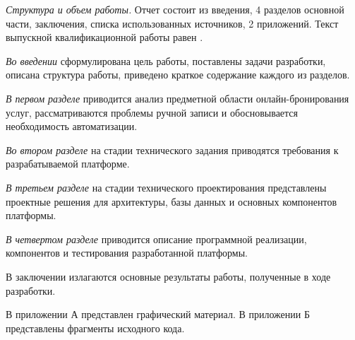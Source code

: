 \emph{Структура и объем работы.} Отчет состоит из введения, 4 разделов основной части, заключения, списка использованных источников, 2 приложений. Текст выпускной квалификационной работы равен .

\emph{Во введении} сформулирована цель работы, поставлены задачи разработки, описана структура работы, приведено краткое содержание каждого из разделов.

\emph{В первом разделе} приводится анализ предметной области онлайн-бронирования услуг, рассматриваются проблемы ручной записи и обосновывается необходимость автоматизации.

\emph{Во втором разделе} на стадии технического задания приводятся требования к разрабатываемой платформе.

\emph{В третьем разделе} на стадии технического проектирования представлены проектные решения для архитектуры, базы данных и основных компонентов платформы.

\emph{В четвертом разделе} приводится описание программной реализации, компонентов и тестирования разработанной платформы.

В заключении излагаются основные результаты работы, полученные в ходе разработки.

В приложении А представлен графический материал. В приложении Б представлены фрагменты исходного кода.
